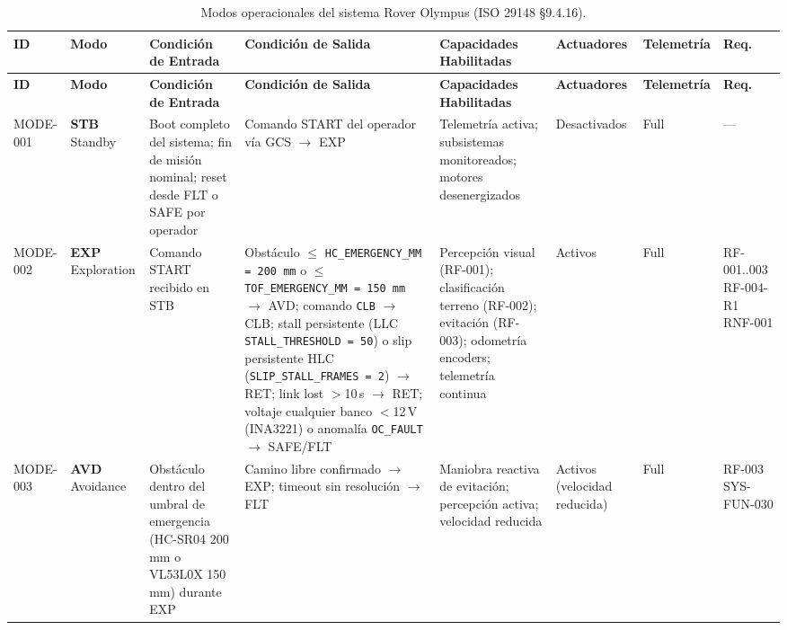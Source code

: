 \begin{landscape}
\centering
\scriptsize
\setlength{\tabcolsep}{3pt}
\renewcommand{\arraystretch}{1.4}
\begin{longtable}{| l | l | p{3.0cm} | p{2.8cm} | p{3.0cm} | p{2.5cm} | p{1.6cm} | p{2.5cm} |}
\caption{Modos operacionales del sistema Rover Olympus (ISO 29148 §9.4.16).}\label{tab:op_modes}\\
\hline
\textbf{ID} & \textbf{Modo} & \textbf{Condición de Entrada} & \textbf{Condición de Salida} & \textbf{Capacidades Habilitadas} & \textbf{Actuadores} & \textbf{Telemetría} & \textbf{Req.} \\ \hline
\endfirsthead
\hline
\textbf{ID} & \textbf{Modo} & \textbf{Condición de Entrada} & \textbf{Condición de Salida} & \textbf{Capacidades Habilitadas} & \textbf{Actuadores} & \textbf{Telemetría} & \textbf{Req.} \\ \hline
\endhead
\hline
\endfoot
\hline
\endlastfoot

MODE-001 & \textbf{STB} \newline Standby &
Boot completo del sistema; fin de misión nominal; reset desde FLT o SAFE por operador &
Comando START del operador vía GCS $\rightarrow$ EXP &
Telemetría activa; subsistemas monitoreados; motores desenergizados &
Desactivados &
Full &
--- \\ \hline

MODE-002 & \textbf{EXP} \newline Exploration &
Comando START recibido en STB &
Obstáculo $\le$ \texttt{HC\_EMERGENCY\_MM = 200\,mm} o $\le$ \texttt{TOF\_EMERGENCY\_MM = 150\,mm} $\rightarrow$ AVD; comando \texttt{CLB} $\rightarrow$ CLB; stall persistente (LLC \texttt{STALL\_THRESHOLD = 50}) o slip persistente HLC (\texttt{SLIP\_STALL\_FRAMES = 2}) $\rightarrow$ RET; link lost $>$10\,s $\rightarrow$ RET; voltaje cualquier banco $<$12\,V (INA3221) o anomalía \texttt{OC\_FAULT} $\rightarrow$ SAFE/FLT &
Percepción visual (RF-001); clasificación terreno (RF-002); evitación (RF-003); odometría encoders; telemetría continua &
Activos &
Full &
RF-001..003 \newline RF-004-R1 \newline RNF-001 \\ \hline

MODE-003 & \textbf{AVD} \newline Avoidance &
Obstáculo dentro del umbral de emergencia (HC-SR04 200\,mm o VL53L0X 150\,mm) durante EXP &
Camino libre confirmado $\rightarrow$ EXP; timeout sin resolución $\rightarrow$ FLT &
Maniobra reactiva de evitación; percepción activa; velocidad reducida &
Activos \newline (velocidad reducida) &
Full &
RF-003 \newline SYS-FUN-030 \\ \hline


\end{longtable}
\end{landscape}
